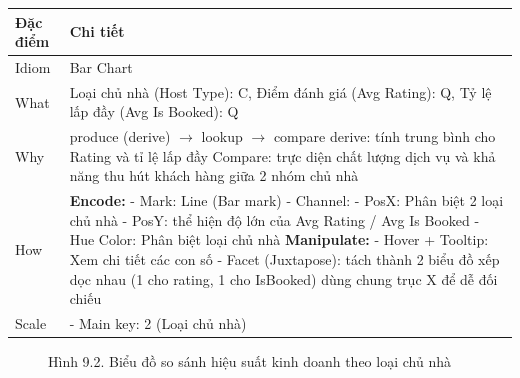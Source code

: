 \begin{longtable}{|p{2.8cm}|p{11.5cm}|}
\hline
\textbf{Đặc điểm} & \textbf{Chi tiết} \\
\hline
\endhead
\hline
\endfoot
Idiom & Bar Chart \\
\hline
What & Loại chủ nhà (Host Type): C, Điểm đánh giá (Avg Rating): Q, Tỷ lệ lấp đầy (Avg Is Booked): Q \\
\hline
Why & produce (derive) $\rightarrow$ lookup $\rightarrow$ compare \newline
\newline
derive: tính trung bình cho Rating và tỉ lệ lấp đầy \newline
\newline
Compare: trực diện chất lượng dịch vụ và khả năng thu hút khách hàng giữa 2 nhóm chủ nhà \\
\hline
How & \textbf{Encode:} \newline
\newline
- Mark: Line (Bar mark) \newline
\newline
- Channel: \newline
\newline
\hspace{0.3cm} - PosX: Phân biệt 2 loại chủ nhà \newline
\newline
\hspace{0.3cm} - PosY: thể hiện độ lớn của Avg Rating / Avg Is Booked \newline
\newline
\hspace{0.3cm} - Hue Color: Phân biệt loại chủ nhà \newline
\newline
\textbf{Manipulate:} \newline
\newline
- Hover + Tooltip: Xem chi tiết các con số \newline
\newline
- Facet (Juxtapose): tách thành 2 biểu đồ xếp dọc nhau (1 cho rating, 1 cho IsBooked) dùng chung trục X để dễ đối chiếu \\
\hline
Scale & - Main key: 2 (Loại chủ nhà) \\
\hline
\end{longtable}

\begin{figure}[H]
    \centering
    \caption{Hình 9.2. Biểu đồ so sánh hiệu suất kinh doanh theo loại chủ nhà}
    \label{fig:domain-task9-chart2}
\end{figure}

